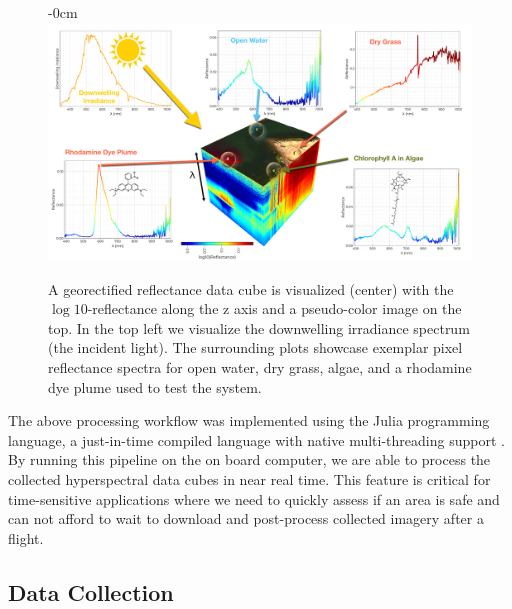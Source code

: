\documentclass[remotesensing,article,submit,pdftex,moreauthors]{Definitions/mdpi}
\begin{document}
\begin{figure}[t!]
\begin{adjustwidth}{-\extralength}{0cm}
\centering
\vspace{-0.3in}
\includegraphics[width=15.5cm]{paper/figures/materials-and-methods/HyperSpectralInfoGraphic.pdf}
\end{adjustwidth}
\caption{A georectified reflectance data cube is visualized (center) with the $\log10$-reflectance along the z axis and a pseudo-color image on the top. In the top left we visualize the downwelling irradiance spectrum (the incident light). The surrounding plots showcase exemplar pixel reflectance spectra for open water, dry grass, algae, and a rhodamine dye plume used to test the system.\label{fig:hsi-infographic}}
\end{figure}  

The above processing workflow was implemented using the Julia programming language, a just-in-time compiled language with native multi-threading support \cite{julia-1}. By running this pipeline on the on board computer, we are able to process the collected hyperspectral data cubes in near real time. This feature is critical for time-sensitive applications where we need to quickly assess if an area is safe and can not afford to wait to download and post-process collected imagery after a flight.

\subsection{Data Collection}
\end{document}
